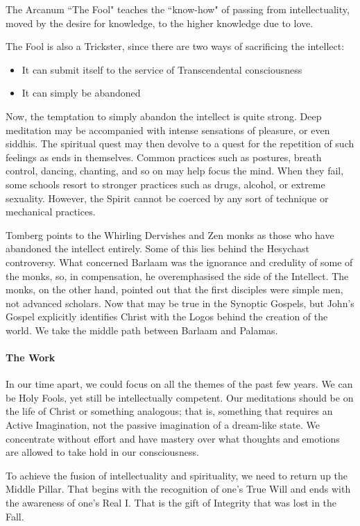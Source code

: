 \begin{quotex}
The Arcanum ``The Fool" teaches the ``know-how" of passing from intellectuality, moved by the desire for knowledge, to the higher knowledge due to love. 

\end{quotex}
The Fool is also a Trickster, since there are two ways of sacrificing the intellect:

\begin{itemize}
\item It can submit itself to the service of Transcendental consciousness 
\item It can simply be abandoned 
\end{itemize}
Now, the temptation to simply abandon the intellect is quite strong. Deep meditation may be accompanied with intense sensations of pleasure, or even siddhis. The spiritual quest may then devolve to a quest for the repetition of such feelings as ends in themselves. Common practices such as postures, breath control, dancing, chanting, and so on may help focus the mind. When they fail, some schools resort to stronger practices such as drugs, alcohol, or extreme sexuality. However, the Spirit cannot be coerced by any sort of technique or mechanical practices.

Tomberg points to the Whirling Dervishes and Zen monks as those who have abandoned the intellect entirely. Some of this lies behind the Hesychast controversy. What concerned Barlaam was the ignorance and credulity of some of the monks, so, in compensation, he overemphasised the side of the Intellect. The monks, on the other hand, pointed out that the first disciples were simple men, not advanced scholars. Now that may be true in the Synoptic Gospels, but John's Gospel explicitly identifies Christ with the Logos behind the creation of the world. We take the middle path between Barlaam and Palamas.

\paragraph{The Work}
In our time apart, we could focus on all the themes of the past few years. We can be Holy Fools, yet still be intellectually competent. Our meditations should be on the life of Christ or something analogous; that is, something that requires an Active Imagination, not the passive imagination of a dream-like state. We concentrate without effort and have mastery over what thoughts and emotions are allowed to take hold in our consciousness.

To achieve the fusion of intellectuality and spirituality, we need to return up the Middle Pillar. That begins with the recognition of one's True Will and ends with the awareness of one's Real I. That is the gift of Integrity that was lost in the Fall.

